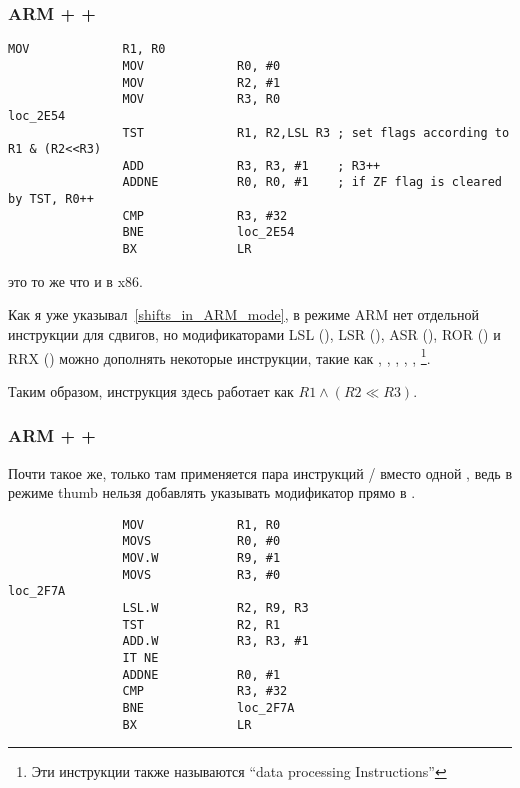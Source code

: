 \subsubsection{ARM + \OptimizingXcode + \ARMMode}

\begin{lstlisting}[caption=\OptimizingXcode + \ARMMode]
                MOV             R1, R0
                MOV             R0, #0
                MOV             R2, #1
                MOV             R3, R0
loc_2E54
                TST             R1, R2,LSL R3 ; set flags according to R1 & (R2<<R3)
                ADD             R3, R3, #1    ; R3++
                ADDNE           R0, R0, #1    ; if ZF flag is cleared by TST, R0++
                CMP             R3, #32
                BNE             loc_2E54
                BX              LR
\end{lstlisting}

 это то же что и \TEST в x86.

Как я уже указывал~\ref{shifts_in_ARM_mode}, в режиме ARM нет отдельной инструкции для сдвигов, 
но модификаторами 
LSL (), 
LSR (), 
ASR (), 
ROR () и 
RRX () можно дополнять некоторые инструкции, такие как \MOV, ,
\CMP, \ADD, \SUB, \footnote{Эти инструкции также называются ``data processing Instructions''}.

Таким образом, инструкция  здесь работает как $R1 \land (R2 \ll R3)$.

\subsubsection{ARM + \OptimizingXcode + \ThumbTwoMode}

Почти такое же, только там применяется пара инструкций / вместо одной ,
ведь в режиме thumb нельзя добавлять указывать модификатор  прямо в .

\begin{lstlisting}
                MOV             R1, R0
                MOVS            R0, #0
                MOV.W           R9, #1
                MOVS            R3, #0
loc_2F7A
                LSL.W           R2, R9, R3
                TST             R2, R1
                ADD.W           R3, R3, #1
                IT NE
                ADDNE           R0, #1
                CMP             R3, #32
                BNE             loc_2F7A
                BX              LR
\end{lstlisting}

